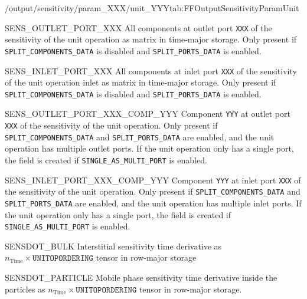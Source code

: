 \begin{groupscope}{/output/sensitivity/param\_XXX/unit\_YYY}{tab:FFOutputSensitivityParamUnit}
  \begin{dataset}[type=double,unit={\si{\mol\per\cubic\metre\of{IV}\per\ParamUnit}}]{SENS\_OUTLET\_PORT\_XXX}
    All components at outlet port \texttt{XXX} of the sensitivity of the unit operation as matrix in time-major storage.
    Only present if \texttt{SPLIT\_COMPONENTS\_DATA} is disabled and \texttt{SPLIT\_PORTS\_DATA} is enabled.
  \end{dataset}
  \begin{dataset}[type=double,unit={\si{\mol\per\cubic\metre\of{IV}\per\ParamUnit}}]{SENS\_INLET\_PORT\_XXX}
    All components at inlet port \texttt{XXX} of the sensitivity of the unit operation inlet as matrix in time-major storage.
    Only present if \texttt{SPLIT\_COMPONENTS\_DATA} is disabled and \texttt{SPLIT\_PORTS\_DATA} is enabled.
  \end{dataset}
  \begin{dataset}[type=double,unit={\si{\mol\per\cubic\metre\of{IV}\per\ParamUnit}}]{SENS\_OUTLET\_PORT\_XXX\_COMP\_YYY}
    Component \texttt{YYY} at outlet port \texttt{XXX} of the sensitivity of the unit operation.
    Only present if \texttt{SPLIT\_COMPONENTS\_DATA} and \texttt{SPLIT\_PORTS\_DATA} are enabled, and the unit operation has multiple outlet ports.
    If the unit operation only has a single port, the field is created if \texttt{SINGLE\_AS\_MULTI\_PORT} is enabled.
  \end{dataset}
  \begin{dataset}[type=double,unit={\si{\mol\per\cubic\metre\of{IV}\per\ParamUnit}}]{SENS\_INLET\_PORT\_XXX\_COMP\_YYY}
    Component \texttt{YYY} at inlet port \texttt{XXX} of the sensitivity of the unit operation.
    Only present if \texttt{SPLIT\_COMPONENTS\_DATA} and \texttt{SPLIT\_PORTS\_DATA} are enabled, and the unit operation has multiple inlet ports.
    If the unit operation only has a single port, the field is created if \texttt{SINGLE\_AS\_MULTI\_PORT} is enabled.
  \end{dataset}
  \begin{dataset}[type=double,unit={\si{\mol\per\cubic\metre\of{IV}\per\second\per\ParamUnit}}]{SENSDOT\_BULK}
    Interstitial sensitivity time derivative as $n_{\text{Time}} \times \texttt{UNITOPORDERING}$ tensor in row-major storage
  \end{dataset}
  \begin{dataset}[type=double,unit={\si{\mol\per\cubic\metre\of{MP}\per\second\per\ParamUnit}}]{SENSDOT\_PARTICLE}
    Mobile phase sensitivity time derivative inside the particles as $n_{\text{Time}} \times \texttt{UNITOPORDERING}$ tensor in row-major storage.

\end{dataset}
\end{groupscope}
